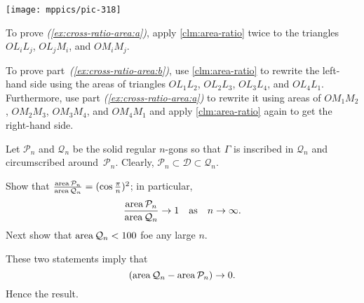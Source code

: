 \begin{Figure}
\vskip0mm
\centering
\texttt{[image: mppics/pic-318]}
\end{Figure}

To prove \textit{(\ref{ex:cross-ratio-area:a})}, apply \ref{clm:area-ratio} twice to the triangles $OL_iL_j$, $OL_jM_i$, and $OM_iM_j$.

To prove part~\textit{(\ref{ex:cross-ratio-area:b})}, use \ref{clm:area-ratio} to rewrite the left-hand side using the areas of triangles $OL_1L_2$, $OL_2L_3$, $OL_3L_4$, and $OL_4L_1$.
Furthermore, use part \textit{(\ref{ex:cross-ratio-area:a})} to rewrite it using areas of $OM_1M_2$, $OM_2M_3$, $OM_3M_4$, and $OM_4M_1$ and apply \ref{clm:area-ratio} again to get the right-hand side.


Let $\mathcal{P}_n$ and $\mathcal{Q}_n$ be the solid regular $n$-gons
so that $\Gamma$ is inscribed in $\mathcal{Q}_n$ and circumscribed around~$\mathcal{P}_n$.
Clearly,
$\mathcal{P}_n\subset\mathcal{D}\subset\mathcal{Q}_n$.

Show that 
$\tfrac{\mathop{\rm area}\nolimits\mathcal{P}_n}{\mathop{\rm area}\nolimits\mathcal{Q}_n}=(\cos\tfrac\pi n)^2$;
in particular, 
$$\frac{\mathop{\rm area}\nolimits\mathcal{P}_n}{\mathop{\rm area}\nolimits\mathcal{Q}_n}\to 1
\quad
\text{as}
\quad
n\to\infty.$$
Next show that $\mathop{\rm area}\nolimits\mathcal{Q}_n<100$ foe any large $n$.

These two statements imply that
\[(\mathop{\rm area}\nolimits\mathcal{Q}_n-\mathop{\rm area}\nolimits\mathcal{P}_n)\to 0.\]
Hence the result.

\spell{\end{multicols}}{}

\newpage

